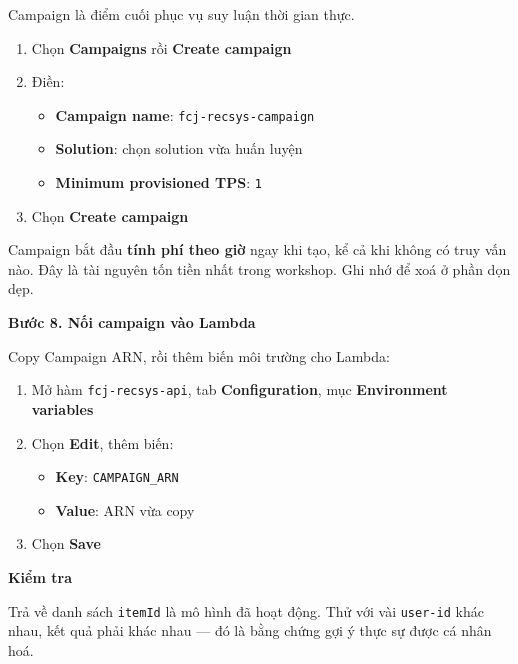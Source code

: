 Campaign là điểm cuối phục vụ suy luận thời gian thực.

\begin{enumerate}
\def\labelenumi{\arabic{enumi}.}
\tightlist
\item
  Chọn \textbf{Campaigns} rồi \textbf{Create campaign}
\item
  Điền:

  \begin{itemize}
  \tightlist
  \item
    \textbf{Campaign name}: \texttt{fcj-recsys-campaign}
  \item
    \textbf{Solution}: chọn solution vừa huấn luyện
  \item
    \textbf{Minimum provisioned TPS}: \texttt{1}
  \end{itemize}
\item
  Chọn \textbf{Create campaign}
\end{enumerate}

Campaign bắt đầu \textbf{tính phí theo giờ} ngay khi tạo, kể cả khi
không có truy vấn nào. Đây là tài nguyên tốn tiền nhất trong workshop.
Ghi nhớ để xoá ở phần dọn dẹp.

\vspace{0.5em}\noindent\textbf{Bước 8. Nối campaign vào
Lambda}\par

Copy Campaign ARN, rồi thêm biến môi trường cho Lambda:

\begin{enumerate}
\def\labelenumi{\arabic{enumi}.}
\tightlist
\item
  Mở hàm \texttt{fcj-recsys-api}, tab \textbf{Configuration}, mục
  \textbf{Environment variables}
\item
  Chọn \textbf{Edit}, thêm biến:

  \begin{itemize}
  \tightlist
  \item
    \textbf{Key}: \texttt{CAMPAIGN\_ARN}
  \item
    \textbf{Value}: ARN vừa copy
  \end{itemize}
\item
  Chọn \textbf{Save}
\end{enumerate}

\vspace{0.5em}\noindent\textbf{Kiểm tra}\par

\begin{Shaded}
\begin{Highlighting}[]
\DataTypeTok{\textbackslash{}}
   \OperatorTok{\textless{}}\OperatorTok{\textgreater{}} \DataTypeTok{\textbackslash{}}
  \DataTypeTok{\textbackslash{}}
\end{Highlighting}
\end{Shaded}

Trả về danh sách \texttt{itemId} là mô hình đã hoạt động. Thử với vài
\texttt{user-id} khác nhau, kết quả phải khác nhau --- đó là bằng chứng
gợi ý thực sự được cá nhân hoá.
